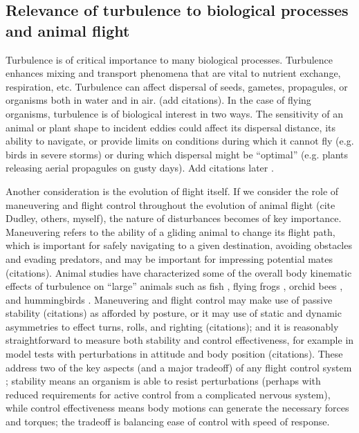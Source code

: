 \documentclass{jfm}
\begin{document}
\subsection{Relevance of turbulence to biological processes and animal flight}
Turbulence is of critical importance to many biological processes.  Turbulence enhances mixing and transport phenomena that are vital to nutrient exchange, respiration, etc.  Turbulence can affect dispersal of seeds, gametes, propagules, or organisms both in water and in air.  (add citations).  In the case of flying organisms, turbulence is of biological interest in two ways.  The sensitivity of an animal or plant shape to incident eddies could affect its dispersal distance, its ability to navigate, or provide limits on conditions during which it cannot fly (e.g. birds in severe storms) or during which dispersal might be ``optimal'' (e.g. plants releasing aerial propagules on gusty days).  Add citations later \citep{Denny:1998, Feitl:2010, McCay:2003, Pavlov:2009, Webb:2010, Reynolds:2010, Lupandin:2005}. 

Another consideration is the evolution of flight itself.  If we consider the role of maneuvering and flight control throughout the evolution of animal flight (cite Dudley, others, myself), the nature of disturbances becomes of key importance.  Maneuvering refers to the ability of a gliding animal to change its flight path, which is important for safely navigating to a given destination, avoiding obstacles and evading predators, and may be important for impressing potential mates (citations).  Animal studies have characterized some of the overall body kinematic effects of turbulence on ``large'' animals such as fish \citep{Feitl:2010, Tritico:2010, Pavlov:2009, Lupandin:2005}, flying frogs \cite{McCay:2003, McCay:2004}, orchid bees \citep{Combes:2009}, and hummingbirds \citep{Ortega:2012x}. Maneuvering and flight control may make use of passive stability (citations) as afforded by posture, or it may use of static and dynamic asymmetries to effect turns, rolls, and righting (citations); and it is reasonably straightforward to measure both stability and control effectiveness, for example in model tests with perturbations in attitude and body position (citations).  These address two of the key aspects (and a major tradeoff) of any flight control system \citep{McCormick:1976}; stability means an organism is able to resist perturbations (perhaps with reduced requirements for active control from a complicated nervous system), while control effectiveness means body motions can generate the necessary forces and torques; the tradeoff is balancing ease of control with speed of response.  
\end{document}
